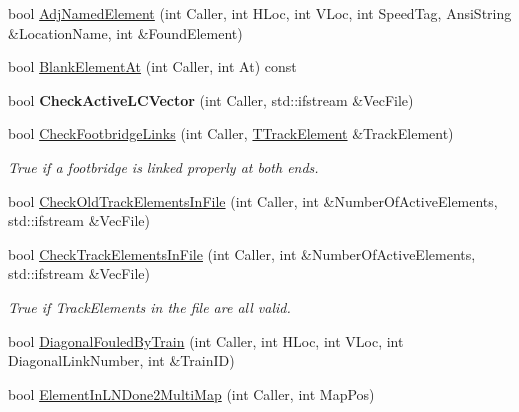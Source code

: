 \begin{DoxyCompactItemize}
\item 
bool \mbox{\hyperlink{class_t_track_a96a3a6bcd38491f4f00ec2a585c6f170}{Adj\+Named\+Element}} (int Caller, int H\+Loc, int V\+Loc, int Speed\+Tag, Ansi\+String \&Location\+Name, int \&Found\+Element)
\item 
bool \mbox{\hyperlink{class_t_track_a928a29de1b2a916a1c829d40b68963e9}{Blank\+Element\+At}} (int Caller, int At) const
\item 
\mbox{\label{class_t_track_a3ff62ece81af00462951a989f3cee4e5}} 
bool {\bfseries Check\+Active\+L\+C\+Vector} (int Caller, std\+::ifstream \&Vec\+File)
\item 
\mbox{\label{class_t_track_a3c3dce0a9200d3c7dc27d26cdd40bb09}} 
bool \mbox{\hyperlink{class_t_track_a3c3dce0a9200d3c7dc27d26cdd40bb09}{Check\+Footbridge\+Links}} (int Caller, \mbox{\hyperlink{class_t_track_element}{T\+Track\+Element}} \&Track\+Element)
\begin{DoxyCompactList}\small\item\em True if a footbridge is linked properly at both ends. \end{DoxyCompactList}\item 
bool \mbox{\hyperlink{class_t_track_a07cde3507d67aff8eac4255ef28fde16}{Check\+Old\+Track\+Elements\+In\+File}} (int Caller, int \&Number\+Of\+Active\+Elements, std\+::ifstream \&Vec\+File)
\item 
\mbox{\label{class_t_track_a9ef606dc7da0eb00c5684c80a4891e04}} 
bool \mbox{\hyperlink{class_t_track_a9ef606dc7da0eb00c5684c80a4891e04}{Check\+Track\+Elements\+In\+File}} (int Caller, int \&Number\+Of\+Active\+Elements, std\+::ifstream \&Vec\+File)
\begin{DoxyCompactList}\small\item\em True if Track\+Elements in the file are all valid. \end{DoxyCompactList}\item 
bool \mbox{\hyperlink{class_t_track_a3b4a2e8a16c61a4286fcf34adb000819}{Diagonal\+Fouled\+By\+Train}} (int Caller, int H\+Loc, int V\+Loc, int Diagonal\+Link\+Number, int \&Train\+ID)
\item 
\mbox{\label{class_t_track_a35cb615d02e6e4debe2fb2b764adc058}} 
bool \mbox{\hyperlink{class_t_track_a35cb615d02e6e4debe2fb2b764adc058}{Element\+In\+L\+N\+Done2\+Multi\+Map}} (int Caller, int Map\+Pos)

\end{DoxyCompactItemize}
